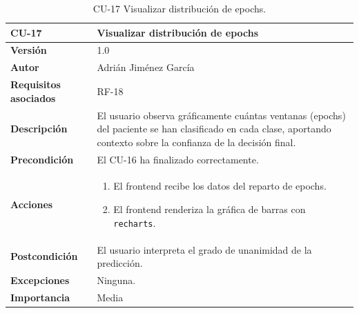 \begin{table}[p]
	\centering
	\begin{tabularx}{\linewidth}{ p{} X }
		\toprule
		\textbf{CU-17}    & \textbf{Visualizar distribución de epochs}\\
		\toprule
		\textbf{Versión}              & 1.0 \\
		\textbf{Autor}                & Adrián Jiménez García \\
		\textbf{Requisitos asociados} & RF-18 \\
		\textbf{Descripción}          & El usuario observa gráficamente cuántas ventanas (epochs) del paciente se han clasificado en cada clase, aportando contexto sobre la confianza de la decisión final. \\
		\textbf{Precondición}         & El CU-16 ha finalizado correctamente. \\
		\textbf{Acciones}             &
		\begin{enumerate}
			\def\labelenumi{\arabic{enumi}.}
			\tightlist
			\item El frontend recibe los datos del reparto de epochs.
			\item El frontend renderiza la gráfica de barras con \texttt{recharts}.
		\end{enumerate}\\
		\textbf{Postcondición}        & El usuario interpreta el grado de unanimidad de la predicción. \\
		\textbf{Excepciones}          & Ninguna. \\
		\textbf{Importancia}          & Media \\
		\bottomrule
	\end{tabularx}
	\caption{CU-17 Visualizar distribución de epochs.}
\end{table}
